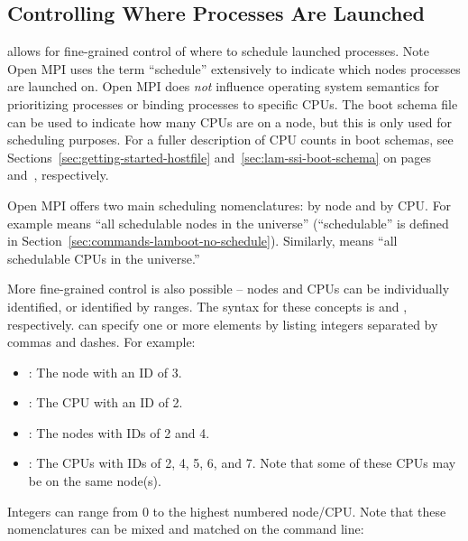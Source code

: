 
\subsection{Controlling Where Processes Are Launched}

 allows for fine-grained control of where to schedule
launched processes.  Note Open MPI uses the term ``schedule'' extensively
to indicate which nodes processes are launched on.  Open MPI does {\em not}
influence operating system semantics for prioritizing processes or
binding processes to specific CPUs.  The boot schema file can be used
to indicate how many CPUs are on a node, but this is only used for
scheduling purposes.  For a fuller description of CPU counts in boot
schemas, see Sections~\ref{sec:getting-started-hostfile}
and~\ref{sec:lam-ssi-boot-schema} on
pages~\pageref{sec:getting-started-hostfile}
and~\pageref{sec:lam-ssi-boot-schema}, respectively.

Open MPI offers two main scheduling nomenclatures: by node and by CPU.  For
example  means ``all schedulable nodes in the universe''
(``schedulable'' is defined in
Section~\ref{sec:commands-lamboot-no-schedule}).  Similarly,
 means ``all schedulable CPUs in the universe.''  

More fine-grained control is also possible -- nodes and CPUs can be
individually identified, or identified by ranges.  The syntax for
these concepts is  and ,
respectively.   can specify one or more elements
by listing integers separated by commas and dashes.  For example:

\begin{itemize}
\item {}: The node with an ID of 3.

\item {}: The CPU with an ID of 2.

\item {}: The nodes with IDs of 2 and 4.

\item {}: The CPUs with IDs of 2, 4, 5, 6, and 7.  Note
  that some of these CPUs may be on the same node(s).
\end{itemize}

Integers can range from 0 to the highest numbered node/CPU.  Note that
these nomenclatures can be mixed and matched on the 
command line:

